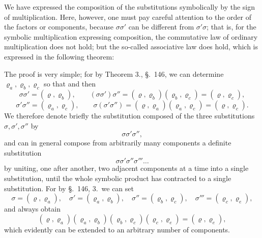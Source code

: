 

We have expressed the composition of the substitutions symbolically by the sign of multiplication. Here, however, one must pay careful attention to the order of the factors or components, because $\sigma \sigma'$ can be different from $\sigma' \sigma$; that is, for the symbolic multiplication expressing composition, the commutative law of ordinary multiplication does not hold; but the so-called associative law does hold, which is expressed in the following theorem:

The proof is very simple; for by Theorem 3., \S.\ 146, we can determine $\varrho_a, \varrho_b, \varrho_c$ so that
and then
\[
\sigma \sigma' = (\varrho, \varrho_b), \qquad (\sigma \sigma') \sigma'' = (\varrho, \varrho_b)(\varrho_b, \varrho_c) = (\varrho, \varrho_c),
\]
\[
\sigma' \sigma'' = (\varrho_a, \varrho_c), \qquad \sigma (\sigma' \sigma'') = (\varrho, \varrho_a)(\varrho_a, \varrho_c) = (\varrho, \varrho_c).
\]
We therefore denote briefly the substitution composed of the three substitutions $\sigma, \sigma', \sigma''$ by
\[
\sigma \sigma' \sigma'',
\]
and can in general compose from arbitrarily many components a definite substitution
\[
\sigma \sigma' \sigma'' \sigma''' \ldots
\]
by uniting, one after another, two adjacent components at a time into a single substitution, until the whole symbolic product has contracted to a single substitution. For by \S.\ 146, 3.\ we can set
\[
\sigma = (\varrho, \varrho_a), \quad \sigma' = (\varrho_a, \varrho_b), \quad \sigma'' = (\varrho_b, \varrho_c), \quad \sigma''' = (\varrho_c, \varrho_e),
\]
and always obtain
\[
(\varrho, \varrho_a)(\varrho_a, \varrho_b)(\varrho_b, \varrho_c)(\varrho_c, \varrho_e) = (\varrho, \varrho_e),
\]
which evidently can be extended to an arbitrary number of components.
